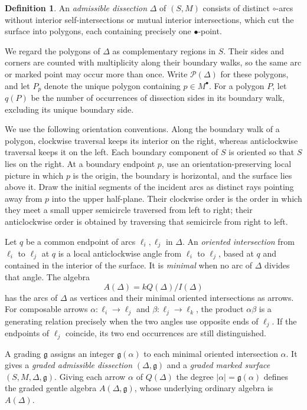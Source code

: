 \documentclass[11pt]{amsart}
\theoremstyle{definition}
\theoremstyle{plain}
\theoremstyle{definition}
\newtheorem{definition}[definition]{Definition}
\theoremstyle{definition}
\begin{document}
\begin{definition}
\label{def:admissible-dissection}
An \emph{admissible dissection} $\Delta$ of $(S,M)$ consists
of distinct $\circ$-arcs without interior self-intersections
or mutual interior intersections, which cut the surface into polygons, each containing precisely one
$\bullet$-point.
\end{definition}

We regard the polygons of $\Delta$ as complementary regions
in $S$. Their sides and corners are counted with multiplicity
along their boundary walks, so the same arc or marked point
may occur more than once.
Write $\mathcal P(\Delta)$ for these polygons, and let $P_p$
denote the unique polygon containing $p\in M^\bullet$.
For a polygon $P$, let $q(P)$ be the number of occurrences
of dissection sides in its boundary walk, excluding its
unique boundary side.

We use the following orientation conventions. Along the
boundary walk of a polygon, clockwise traversal keeps its
interior on the right, whereas anticlockwise traversal
keeps it on the left. Each boundary component of $S$ is
oriented so that $S$ lies on the right.
At a boundary endpoint $p$, use an orientation-preserving local
picture in which $p$ is the origin, the boundary is horizontal,
and the surface lies above it.  Draw the initial segments of
the incident arcs as distinct rays pointing away from $p$ into
the upper half-plane.  Their clockwise order is the order in
which they meet a small upper semicircle traversed from left
to right; their anticlockwise order is obtained by traversing
that semicircle from right to left.  

Let $q$ be a common endpoint of arcs $\ell_i,\ell_j$ in $\Delta$.
An \emph{oriented intersection} from $\ell_i$ to $\ell_j$ at $q$ is a local
anticlockwise angle from $\ell_i$ to $\ell_j$, based at $q$ and contained
in the interior of the surface.
It is \emph{minimal} when no arc
of $\Delta$ divides that angle.  The algebra
\[
 A(\Delta)=kQ(\Delta)/I(\Delta)
\]
has the arcs of $\Delta$ as vertices and their minimal oriented
intersections as arrows.  For composable arrows
$\alpha:\ell_i\to\ell_j$ and $\beta:\ell_j\to\ell_k$, the product
$\alpha\beta$ is a generating relation precisely when the two angles use
opposite ends of $\ell_j$.  If the endpoints of $\ell_j$ coincide, its two
end occurrences are still distinguished.

A grading $\mathfrak g$ assigns an integer $\mathfrak g(\alpha)$ to each
minimal oriented intersection $\alpha$.  It gives a \emph{graded admissible
dissection} $(\Delta,\mathfrak g)$ and a \emph{graded marked surface}
$(S,M,\Delta,\mathfrak g)$.  Giving each arrow $\alpha$ of $Q(\Delta)$ the
degree $|\alpha|=\mathfrak g(\alpha)$ defines the graded gentle algebra
$A(\Delta,\mathfrak g)$, whose underlying ordinary algebra is $A(\Delta)$.
\end{document}
